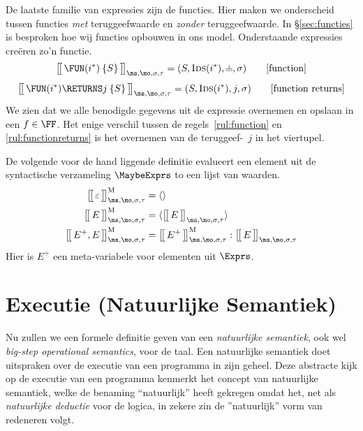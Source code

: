 De laatste familie van expressies zijn de functies. Hier maken we onderscheid tussen functies \emph{met} teruggeefwaarde en \emph{zonder} teruggeefwaarde. In §\ref{sec:functies} is besproken hoe wij functies opbouwen in ons model. Onderstaande expressies creëren zo'n functie.
%
\begin{equation}
  \Express{\FUN (i^*) \: \{S\}}{\ms,\mo,\sigma,\tau} = (S, \textsc{Ids}(i^*), \nil, \sigma)
  \tag*{[function]}\label{rul:function}
\end{equation}
%
\begin{equation}
  \Express{\FUN (i^*) \RETURNS j \: \{S\}}{\ms,\mo,\sigma,\tau} = (S, \textsc{Ids}(i^*), j, \sigma)
  \tag*{[function returns]}\label{rul:functionreturns}
\end{equation}
%
We zien dat we alle benodigde gegevens uit de expressie overnemen en opslaan in een $f\in\FF$. Het enige verschil tussen de regels~\ref{rul:function} en \ref{rul:functionreturns} is het overnemen van de teruggeef-\Id\ $j$ in het viertupel.

De volgende voor de hand liggende definitie evalueert een element uit de syntactische verzameling $\MaybeExprs$ to een lijst van waarden.
%
\begin{align*}
  \Express[M]{\varepsilon}{\ms,\mo,\sigma,\tau} &= \langle\rangle \\
  \Express[M]{E}{\ms,\mo,\sigma,\tau} &= \langle \Express{E}{\ms,\mo,\sigma,\tau} \rangle \\
  \Express[M]{E^+, E}{\ms,\mo,\sigma,\tau} &= \Express[M]{E^+}{\ms,\mo,\sigma,\tau} : \Express{E}{\ms,\mo,\sigma,\tau}
\end{align*}
%
Hier is $E^+$ een meta-variabele voor elementen uit $\Exprs$.

\section{Executie (Natuurlijke Semantiek)}

Nu zullen we een formele definitie geven van een \emph{natuurlijke semantiek}, ook wel \emph{big-step operational semantics}, voor de taal. Een natuurlijke semantiek doet uitspraken over de executie van een programma in zijn geheel. Deze abstracte kijk op de executie van een programma kenmerkt het concept van natuurlijke semantiek, welke de benaming ``natuurlijk'' heeft gekregen omdat het, net als \emph{natuurlijke deductie} voor de logica, in zekere zin de ''natuurlijk'' vorm van redeneren volgt.

